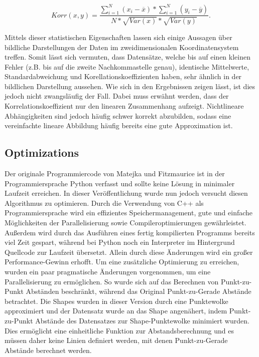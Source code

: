 \documentclass[sigconf]{acmart}
\begin{document}
$$
Korr(x,y)= \frac{
  \sum_{i=1}^{N}(x_i - \overline{x})* \sum_{i=1}^{N}(y_i - \overline{y})
}{
  N * \sqrt{Var(x)} * \sqrt{Var(y)}
}.
$$

Mittels dieser statistischen Eigenschaften lassen sich einige Aussagen über bildliche Darstellungen der Daten im zweidimensionalen Koordinatensystem treffen. Somit lässt sich vermuten, dass Datensätze, welche bis auf einen kleinen Fehler (z.B. bis auf die zweite Nachkommastelle genau), identische Mittelwerte, Standardabweichung und Korellationskoeffizienten haben, sehr ähnlich in der bildlichen Darstellung aussehen. Wie sich in den Ergebnissen zeigen lässt, ist dies jedoch nicht zwangsläufig der Fall. Dabei muss erwähnt werden, dass der Korrelationskoeffizient nur den linearen Zusammenhang aufzeigt. Nichtlineare Abhängigkeiten sind jedoch häufig schwer korrekt abzubilden, sodass eine vereinfachte lineare Abbildung häufig bereits eine gute Approximation ist.


\subsection{Optimizations}\label{sec:algo:opti}

Der originale Programmiercode von Matejka und Fitzmaurice\cite{matejka2017same} ist in der Programmiersprache Python verfasst und sollte keine Lösung in minimaler Laufzeit erreichen. In dieser Veröffentlichung wurde nun jedoch versucht diesen Algorithmus zu optimieren. Durch die Verwendung von C++ als Programmiersprache wird ein effizientes Speichermanagement, gute und einfache Möglichkeiten der Parallelisierung sowie Compileroptimierungen gewährleistet. Außerdem wird durch das Ausführen eines fertig kompilierten Programms bereits viel Zeit gespart, während bei Python noch ein Interpreter im Hintergrund Quellcode zur Laufzeit übersetzt. Allein durch diese Änderungen wird ein großer Performance-Gewinn erhofft. 
Um eine zusätzliche Optimierung zu erreichen, wurden ein paar pragmatische Änderungen vorgenommen, um eine Parallelisierung zu ermöglichen. So wurde sich auf das Berechnen von Punkt-zu-Punkt Abständen beschränkt, während das Original Punkt-zu-Gerade Abstände betrachtet. Die Shapes wurden in dieser Version durch eine Punktewolke approximiert und der Datensatz wurde an das Shape angenähert, indem Punkt-zu-Punkt Abstände des Datensatzes zur Shape-Punktewolke minimiert wurden. Dies ermöglicht eine einheitliche Funktion zur Abstandsberechnung und es müssen daher keine Linien definiert werden, mit denen Punkt-zu-Gerade Abstände berechnet werden.   
\end{document}
